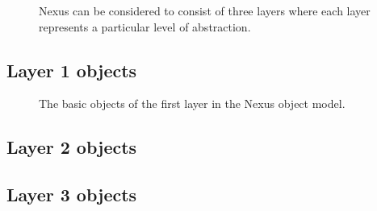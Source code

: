 \begin{figure}[tb]
    \centering
    \begin{minipage}[c]{0.5\linewidth}
    \centering
    \end{minipage}
    \hfill
    \begin{minipage}[c]{0.45\linewidth}
    \caption{{\small Nexus can be considered to consist of three layers where
    each layer represents a particular level of abstraction.}}
    \label{fig:nxintro:layers}
    \end{minipage}
\end{figure}

\subsection{Layer 1 objects}

\begin{figure}[tb]
    \centering
    \begin{minipage}[c]{0.4\linewidth}
    \centering
    \end{minipage}
    \hspace{0.05\linewidth}
    \begin{minipage}[c]{0.5\linewidth}
    \caption{{\small The basic objects of the first layer in the Nexus object
    model.}}
    \label{fig:nxintro:layer1}
    \end{minipage}
\end{figure}

\subsection{Layer 2 objects}

\subsection{Layer 3 objects}
